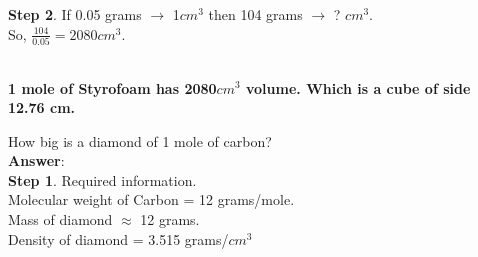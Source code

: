 \documentclass[11pt]{exam}
\begin{document}
\begin{questions}
{\begin{minipage}{38em}
\textbf{Step 2}. If 0.05 grams $\rightarrow$ 1$cm^{3}$ then 104 grams $\rightarrow$ ? $cm^{3}$.\\

So, $\frac{104}{0.05} = 2080 cm^{3}$. \\ 
\end{minipage}} \\ 

\textbf{1 mole of Styrofoam has 2080$cm^{3}$ volume. Which is a cube of side 12.76 cm.} \\


\question
\label{Q6:Diamond}

How big is a diamond of 1 mole of carbon?\\
\textbf{Answer}: \\
\textbf{Step 1}. Required information. \\
                 Molecular weight of Carbon = 12 grams/mole. \\
                 Mass of diamond $\approx$ 12 grams. \\
                 Density of diamond = 3.515 grams/$cm^{3}$ \\ 
                                  
 \\
 

\end{questions}
\end{document}

